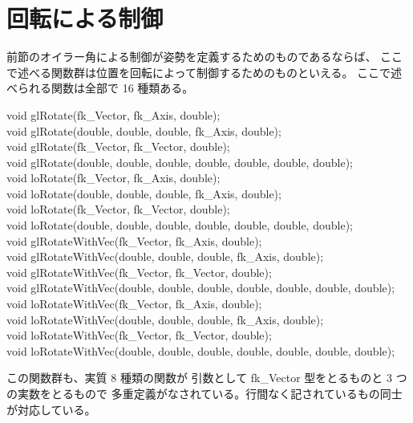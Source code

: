 \section{回転による制御}
前節のオイラー角による制御が姿勢を定義するためのものであるならば、
ここで述べる関数群は位置を回転によって制御するためのものといえる。
ここで述べられる関数は全部で 16 種類ある。
\begin{description}
\item[void glRotate(fk\_Vector, fk\_Axis, double);]
\item[void glRotate(double, double, double, fk\_Axis, double);]
\item[void glRotate(fk\_Vector, fk\_Vector, double);]
\item[void glRotate(double, double, double, double, double, double, double);]
\item[void loRotate(fk\_Vector, fk\_Axis, double);]
\item[void loRotate(double, double, double, fk\_Axis, double);]
\item[void loRotate(fk\_Vector, fk\_Vector, double);]
\item[void loRotate(double, double, double, double, double, double, double);]
\item[void glRotateWithVec(fk\_Vector, fk\_Axis, double);]
\item[void glRotateWithVec(double, double, double, fk\_Axis, double);]
\item[void glRotateWithVec(fk\_Vector, fk\_Vector, double);]
\item[void glRotateWithVec(double, double, double, double, double, double, double);]
\item[void loRotateWithVec(fk\_Vector, fk\_Axis, double);]
\item[void loRotateWithVec(double, double, double, fk\_Axis, double);]
\item[void loRotateWithVec(fk\_Vector, fk\_Vector, double);]
\item[void loRotateWithVec(double, double, double, double, double, double, double);]
\end{description}

この関数群も、実質 8 種類の関数が
引数として fk\_Vector 型をとるものと 3 つの実数をとるもので
多重定義がなされている。行間なく記されているもの同士が対応している。
